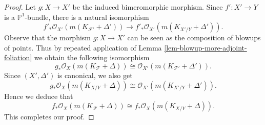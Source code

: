 \documentclass[12pt]{amsart}
\newcommand{\<}{\leq}
\def\subset{\subseteq}
\newcommand{\D}{\Delta}
\def\mcF{\mathcal{F}}
\newtheorem{lemma}[theorem]{Lemma}
\theoremstyle{remark}
\theoremstyle{definition}
\theoremstyle{definition}
\numberwithin{equation}{section}
\theoremstyle{definition}
\theoremstyle{definition}
\begin{document}
\begin{proof}
Let $g\colon X\to X'$ be the induced bimeromorphic morphism.  
Since $f' \colon X'\to Y$ is a   $\mathbb{P}^1$-bundle, there is a  natural isomorphism
\[
f'_*\mathcal{O}_{X'}(m(K_{\mcF'}+ \D')) \to  f'_*\mathcal{O}_{X'}(m(K_{X'/Y}+ \D')). 
\]  
Observe that the   morphism $g\colon X\to X'$ can be seen as the composition of  blowups of points. 
Thus by repeated application of Lemma \ref{lem-blowup-more-adjoint-foliation} we obtain the following isomorphism  
\[ 
g_*\mathcal{O}_{X}(m(K_{\mcF}+ \D)) \cong \mathcal{O}_{X'}(m(K_{\mcF'}+ \D')). \]
Since $(X',\D')$ is canonical, we also get  
\[
g_*\mathcal{O}_{X}(m(K_{X/Y}+ \D)) \cong  \mathcal{O}_{X'}(m(K_{X'/Y}+ \D')).
\]
Hence we deduce that 
\[ 
f_*\mathcal{O}_{X}(m(K_{\mcF}+ \D)) \cong  f_*\mathcal{O}_{X}(m(K_{X/Y}+ \D)). 
\]
This completes our proof.
\end{proof} 





  
\end{document}
